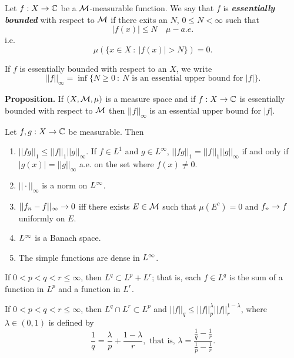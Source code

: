 \vs

\dfn Let $f:X\rightarrow \mathbb{C}$ be a $\mathcal{M}$-measurable function. We say that $f$ is \textbf{\textit{essentially bounded}} with respect to $\mathcal{M}$ if there exits an $N$, $0\leq N < \infty$ such that
\[|f(x)|\leq N\quad \mu-a.e.\]
i.e.
\[\mu(\{x\in X\ :\ |f(x)| > N\}) = 0.\]

\vs

\dfn If $f$ is essentially bounded with respect to an $X$, we write
\[||f||_\infty = \inf\{N\geq 0\ :\ N\text{ is an essential upper bound for }|f|\}.\]

\vs

\textbf{Proposition.} If $(X, \mathcal{M}, \mu)$ is a measure space and if $f:X\rightarrow \mathbb{C}$ is essentially bounded with respect to $\mathcal{M}$ then $||f||_\infty$ is an essential upper bound for $|f|$.

\vs

\begin{thm}Let $f,g:X\rightarrow \mathbb{C}$ be measurable. Then
\begin{enumerate}
    \item $||fg||_1 \leq ||f||_1||g||_\infty$. If $f\in L^1$ and $g\in L^\infty$, $||fg||_1 = ||f||_1||g||_\infty$ if and only if $|g(x)| = ||g||_\infty$ a.e. on the set where $f(x) \neq 0$.
    \item $||\cdot||_\infty$ is a norm on $L^\infty$.
    \item $||f_n - f||_\infty \rightarrow 0$ iff there exists $E\in \mathcal{M}$ such that $\mu(E^c) = 0$ and $f_n\rightarrow f$ uniformly on $E$.
    \item $L^\infty$ is a Banach space.
    \item The simple functions are dense in $L^\infty$.
\end{enumerate}
\end{thm}

\vs

\begin{prop}
If $0 < p < q < r\leq \infty$, then $L^q\subset L^p + L^r$; that is, each $f\in L^q$ is the sum of a function in $L^p$ and a function in $L^r$.
\end{prop}

\vs

\begin{prop}
If $0 < p < q < r\leq \infty$, then $L^q\cap L^r \subset L^p$ and $||f||_q\leq ||f||^\lambda_p||f||^{1-\lambda}_r$, where $\lambda\in (0,1)$ is defined by
\[\frac{1}{q} = \frac{\lambda}{p} + \frac{1 - \lambda}{r},\text{ that is, } \lambda = \frac{\frac{1}{q} - \frac{1}{r}}{\frac{1}{p} - \frac{1}{r}}.\]
\end{prop}

